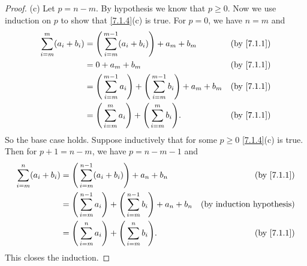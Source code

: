 \begin{proof}{(c)}
  Let \(p = n - m\).
  By hypothesis we know that \(p \geq 0\).
  Now we use induction on \(p\) to show that \cref{7.1.4}(c) is true.
  For \(p = 0\), we have \(n = m\) and
  \begin{align*}
    \sum_{i = m}^m (a_i + b_i) & = \Bigg(\sum_{i = m}^{m - 1} (a_i + b_i)\Bigg) + a_m + b_m                                & \text{(by \cref{7.1.1})} \\
                               & = 0 + a_m + b_m                                                                           & \text{(by \cref{7.1.1})} \\
                               & = \Bigg(\sum_{i = m}^{m - 1} a_i\Bigg) + \Bigg(\sum_{i = m}^{m - 1} b_i\Bigg) + a_m + b_m & \text{(by \cref{7.1.1})} \\
                               & = \Bigg(\sum_{i = m}^m a_i\Bigg) + \Bigg(\sum_{i = m}^m b_i\Bigg).                        & \text{(by \cref{7.1.1})}
  \end{align*}
  So the base case holds.
  Suppose inductively that for some \(p \geq 0\) \cref{7.1.4}(c) is true.
  Then for \(p + 1 = n - m\), we have \(p = n - m - 1\) and
  \begin{align*}
    \sum_{i = m}^n (a_i + b_i) & = \Bigg(\sum_{i = m}^{n - 1} (a_i + b_i)\Bigg) + a_n + b_n                                & \text{(by \cref{7.1.1})}         \\
                               & = \Bigg(\sum_{i = m}^{n - 1} a_i\Bigg) + \Bigg(\sum_{i = m}^{n - 1} b_i\Bigg) + a_n + b_n & \text{(by induction hypothesis)} \\
                               & = \Bigg(\sum_{i = m}^n a_i\Bigg) + \Bigg(\sum_{i = m}^n b_i\Bigg).                        & \text{(by \cref{7.1.1})}
  \end{align*}
  This closes the induction.
\end{proof}

